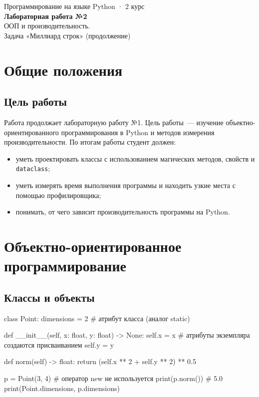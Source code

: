 \documentclass[11pt,a4paper]{article}
\newcommand{\code}[1]{\texttt{#1}}
\begin{document}
\begin{center}
  {\sffamily\small Программирование на языке Python · 2 курс}\\[0.6em]
  {\sffamily\LARGE\bfseries Лабораторная работа №2}\\[0.4em]
  {\sffamily\Large ООП и производительность.\\ Задача «Миллиард строк» (продолжение)}
\end{center}

\tableofcontents
\newpage

\section{Общие положения}

\subsection{Цель работы}

Работа продолжает лабораторную работу №1. Цель работы~— изучение объектно-ориентированного
программирования в Python и методов измерения производительности. По итогам работы студент
должен:

\begin{itemize}
  \item уметь проектировать классы с использованием магических методов, свойств и \code{dataclass};
  \item уметь измерять время выполнения программы и находить узкие места с помощью профилировщика;
  \item понимать, от чего зависит производительность программы на Python.
\end{itemize}

\section{Объектно-ориентированное программирование}

\subsection{Классы и объекты}

\begin{py}
class Point:
    dimensions = 2                      # атрибут класса (аналог static)

    def __init__(self, x: float, y: float) -> None:
        self.x = x                      # атрибуты экземпляра создаются присваиванием
        self.y = y

    def norm(self) -> float:
        return (self.x ** 2 + self.y ** 2) ** 0.5


p = Point(3, 4)         # оператор new не используется
print(p.norm())         # 5.0
print(Point.dimensions, p.dimensions)
\end{py}
\end{document}
